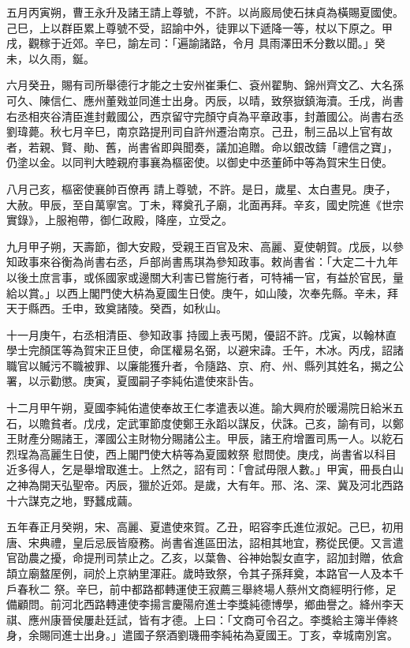 \begin{pinyinscope}
 五月丙寅朔，曹王永升及諸王請上尊號，不許。以尚廄局使石抹貞為橫賜夏國使。己巳，上以群臣累上尊號不受，詔諭中外，徒罪以下遞降一等，杖以下原之。甲戌，觀稼于近郊。辛巳，諭左司：「遍諭諸路，令月
 具雨澤田禾分數以聞。」癸未，以久雨，鋋。



 六月癸丑，賜有司所舉德行才能之士安州崔秉仁、袞州翟駒、錦州齊文乙、大名孫可久、陳信仁、應州董戣並同進士出身。丙辰，以晴，致祭嶽鎮海瀆。壬戌，尚書右丞相夾谷清臣進封戴國公，西京留守完顏守貞為平章政事，封蕭國公。尚書右丞劉瑋薨。秋七月辛巳，南京路提刑司自許州遷治南京。己丑，制三品以上官有故者，若親、賢、勛、舊，尚書省即與聞奏，議加追贈。命以銀改鑄「禮信之寶」，仍塗以金。以同判大睦親府事襄為樞密使。以御史中丞董師中等為賀宋生日使。



 八月己亥，樞密使襄帥百僚再
 請上尊號，不許。是日，歲星、太白晝見。庚子，大赦。甲辰，至自萬寧宮。丁未，釋奠孔子廟，北面再拜。辛亥，國史院進《世宗實錄》，上服袍帶，御仁政殿，降座，立受之。



 九月甲子朔，天壽節，御大安殿，受親王百官及宋、高麗、夏使朝賀。戊辰，以參知政事來谷衡為尚書右丞，戶部尚書馬琪為參知政事。敕尚書省：「大定二十九年以後土庶言事，或係國家或邊關大利害已嘗施行者，可特補一官，有益於官民，量給以賞。」以西上閣門使大枿為夏國生日使。庚午，如山陵，次奉先縣。辛未，拜天于縣西。壬申，致奠諸陵。癸酉，如秋山。



 十一月庚午，右丞相清臣、參知政事
 持國上表丐閑，優詔不許。戊寅，以翰林直學士完顏匡等為賀宋正旦使，命匡權易名弼，以避宋諱。壬午，木冰。丙戌，詔諸職官以贓污不職被罪、以廉能獲升者，令隨路、京、府、州、縣列其姓名，揭之公署，以示勸懲。庚寅，夏國嗣子李純佑遣使來訃告。



 十二月甲午朔，夏國李純佑遣使奉故王仁孝遣表以進。諭大興府於暖湯院日給米五石，以贍貧者。戊戌，定武軍節度使鄭王永蹈以謀反，伏誅。己亥，諭有司，以鄭王財產分賜諸王，澤國公主財物分賜諸公主。甲辰，諸王府增置司馬一人。以紇石烈珵為高麗生日使，西上閣門使大枿等為夏國敕祭
 慰問使。庚戌，尚書省以科目近多得人，乞是舉增取進士。上然之，詔有司：「會試毋限人數。」甲寅，冊長白山之神為開天弘聖帝。丙辰，獵於近郊。是歲，大有年。邢、洺、深、冀及河北西路十六謀克之地，野蠶成繭。



 五年春正月癸朔，宋、高麗、夏遣使來賀。乙丑，昭容李氏進位淑妃。己巳，初用唐、宋典禮，皇后忌辰皆廢務。尚書省進區田法，詔相其地宜，務從民便。又言遣官劭農之擾，命提刑司禁止之。乙亥，以葉魯、谷神始製女直字，詔加封贈，依倉頡立廟盩厔例，祠於上京納里渾莊。歲時致祭，令其子孫拜奠，本路官一人及本千戶春秋二
 祭。辛巳，前中都路都轉運使王寂薦三舉終場人蔡州文商經明行修，足備顧問。前河北西路轉連使李揚言慶陽府進士李獎純德博學，鄉曲譽之。絳州李天祺、應州康晉侯屢赴廷試，皆有才德。上曰：「文商可令召之。李獎給主簿半俸終身，余賜同進士出身。」遣國子祭酒劉璣冊李純祐為夏國王。丁亥，幸城南別宮。




\end{pinyinscope}
